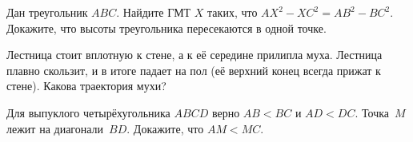 \begin{problems}
\item
\sp
Дан треугольник $ABC$.
Найдите ГМТ $X$ таких, что $AX^2 - XC^2 = AB^2 - BC^2$.
\\
\sp
Докажите, что высоты треугольника пересекаются в одной точке. 

\item
Лестница стоит вплотную к стене, а к её середине прилипла муха.
Лестница плавно скользит, и в итоге падает на пол
(её верхний конец всегда прижат к стене).
Какова траектория мухи?

\item
Для выпуклого четырёхугольника $ABCD$ верно $AB < BC$ и $AD < DC$.
Точка~$M$ лежит на диагонали~$BD$.
Докажите, что $AM < MC$.

\end{problems}

